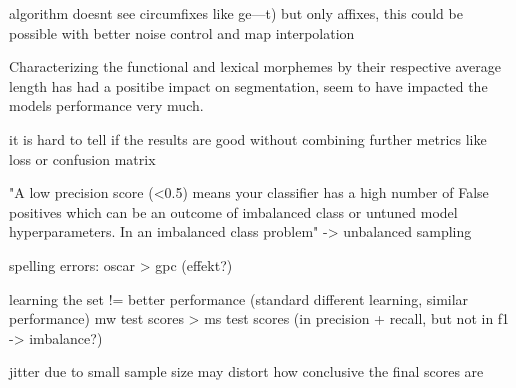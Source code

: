 
algorithm doesnt see circumfixes like ge---t) but only affixes, this could be possible with better noise control and map interpolation

Characterizing the functional and lexical morphemes by their respective average length has had a positibe impact on segmentation, seem to have impacted the models performance very much.

it is hard to tell if the results are good without combining further metrics like loss or confusion matrix

"A low precision score (<0.5) means your classifier has a high number of False positives which can be an outcome of imbalanced class or untuned model hyperparameters. In an imbalanced class problem"
-> unbalanced sampling



spelling errors: oscar > gpc (effekt?)

learning the set != better performance (standard different learning, similar performance)
mw test scores > ms test scores (in precision + recall, but not in f1 -> imbalance?)

jitter due to small sample size may distort how conclusive the final scores are